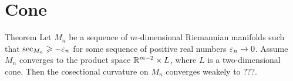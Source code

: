 \section{Cone}

\begin{thm}{Theorem}
Let $M_n$ be a sequence of $m$-dimensional Riemannian manifolds such that 
$\sec_{M_n}\geqslant -\varepsilon_n$ for some sequence of positive real numbers $\varepsilon_n\to 0$.
Assume $M_n$ converges to the product space $\mathbb{R}^{m-2}\times L$, where $L$ is a two-dimensional cone.
Then the cosectional curvature on $M_n$ converges weakely to ???.
\end{thm}
